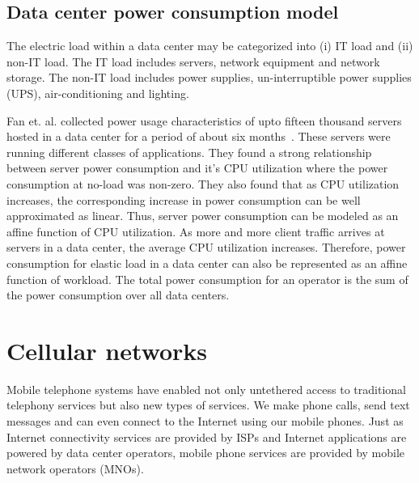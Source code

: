 \subsection{Data center power consumption model} 
The electric load within a data center may be categorized into (i) IT load and (ii) non-IT load. The IT load includes servers, network equipment and network storage. The non-IT load includes power supplies, un-interruptible power supplies (UPS), air-conditioning and lighting. 

Fan et. al. collected power usage characteristics of upto fifteen thousand servers hosted in a data center for a period of about six months~\cite{Fan:power:ICSA:2007}. These servers were running different classes of applications. They found a strong relationship between server power consumption and it's CPU utilization where the power consumption at no-load was non-zero. They also found that as CPU utilization increases, the corresponding increase in power consumption can be well approximated as linear. Thus, server power consumption can be modeled as an affine function of CPU utilization. As more and more client traffic arrives at servers in a data center, the average CPU utilization increases. Therefore, power consumption for elastic load in a data center can also be represented as an affine function of workload. The total power consumption for an operator is the sum of the power consumption over all data centers. 

\section{Cellular networks} %
Mobile telephone systems have enabled not only untethered access to traditional telephony services but also new types of services. We make phone calls, send text messages and can even connect to the Internet using our mobile phones. Just as Internet connectivity services are provided by ISPs and Internet applications are powered by data center operators, mobile phone services are provided by mobile network operators (MNOs).  

